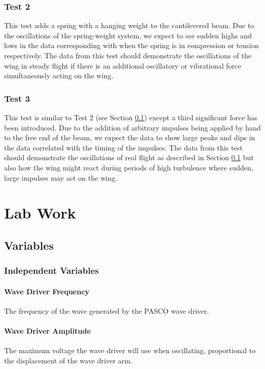 \documentclass[12 pt]{report}
\begin{document}
\subsection{Test 2} \label{hypothesis-test_2}
This test adds a spring with a hanging weight to the cantilevered beam. Due to the oscillations of the spring-weight system, we expect to see sudden highs and lows in the data corresponding with when the spring is in compression or tension respectively. The data from this test should demonstrate the oscillations of the wing in steady flight if there is an additional oscillatory or vibrational force simultaneously acting on the wing.

\subsection{Test 3} \label{hypothesis-test_3}
This test is similar to Test 2 (see Section \ref{hypothesis-test_2}) except a third significant force has been introduced. Due to the addition of arbitrary impulses being applied by hand to the free end of the beam, we expect the data to show large peaks and dips in the data correlated with the timing of the impulses. The data from this test should demonstrate the oscillations of real flight as described in Section \ref{hypothesis-test_2} but also how the wing might react during periods of high turbulence where sudden, large impulses may act on the wing.

\chapter{Lab Work} \label{lab_work}
\section{Variables} \label{variables}
\subsection{Independent Variables} \label{variables-independent_variables}
\subsubsection{Wave Driver Frequency} \label{variables-independent_variables-wave_drive_frequency}
The frequency of the wave generated by the PASCO wave driver.

\subsubsection{Wave Driver Amplitude} \label{variables-independent_variables-wave_driver_amplitude}
The maximum voltage the wave driver will use when oscillating, proportional to the displacement of the wave driver arm.
\end{document}
